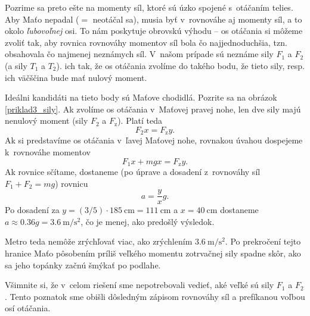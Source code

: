 Pozrime sa preto ešte na momenty síl, ktoré sú úzko spojené s~otáčaním telies.
Aby Maťo nepadal ($=$ neotáčal sa), musia byť v~rovnováhe aj momenty síl,
a to okolo \emph{ľubovoľnej} osi. To nám poskytuje obrovskú výhodu -- os otáčania
si môžeme zvoliť tak, aby rovnica rovnováhy momentov síl bola čo najjednoduchšia, tzn. obsahovala
čo najmenej neznámych síl. V~našom prípade sú neznáme sily $F_1$ a $F_2$ (a sily
$T_1$ a $T_2$).  ich tak, že os otáčania zvolíme do takého bodu, že
tieto sily, resp. ich väčščina bude mať nulový moment.

Ideálni kandidáti na tieto body sú Maťove chodidlá. Pozrite sa na obrázok
\ref{priklad3_sily}. Ak zvolíme os otáčania v~Maťovej pravej nohe, len dve sily
majú nenulový moment (sily $F_2$ a $F_{\mathrm{z}}$). Platí teda
$$
  F_2 x = F_{\mathrm{z}} y\text{.}
$$
Ak si predstavíme os otáčania v~ľavej Maťovej nohe, rovnakou úvahou dospejeme
k~rovnováhe momentov
$$
  F_1 x + mg x = F_{\mathrm{z}} y\text{.}
$$
Ak rovnice sčítame, dostaneme (po úprave a dosadení z~rovnováhy síl $F_1 + F_2 = mg$)
rovnicu
$$
   a = \frac{y}{x} g\text{.}
$$
Po dosadení za $y = (3/5) \cdot \SI{185}{\cm} = \SI{111}{\cm}$ a $x = \SI{40}{\cm}$
dostaneme $a \approx 0.36 g = \SI{3.6}{\meter\per\second\squared}$, čo je menej, ako predošlý výsledok.

Metro teda nemôže zrýchľovať viac, ako zrýchlením $\SI{3.6}{\meter\per\second\squared}$.
Po prekročení tejto hranice Maťo pôsobením príliš veľkého momentu zotrvačnej
sily spadne skôr, ako sa jeho topánky začnú šmýkať po podlahe.

Všimnite si, že v~celom riešení sme nepotrebovali vedieť, aké veľké sú sily
$F_1$ a $F_2$. Tento poznatok sme obišli dôsledným zápisom rovnováhy síl
a prefíkanou voľbou osí otáčania. 
